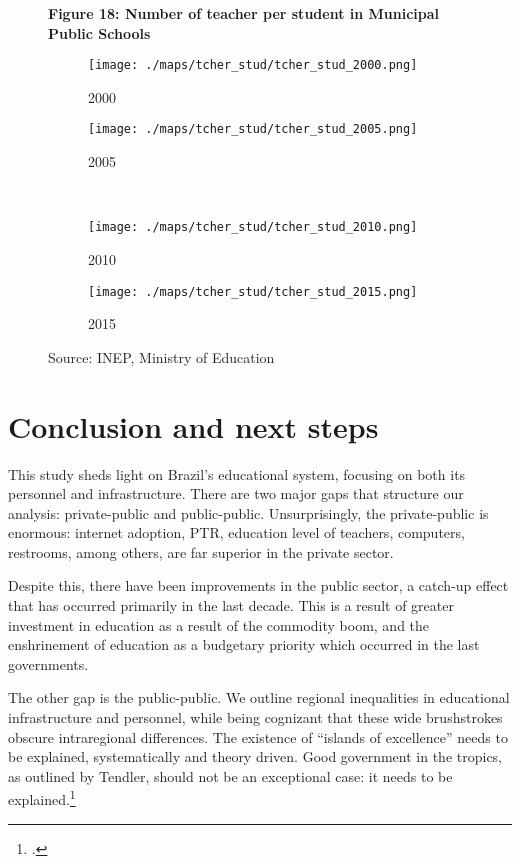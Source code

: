 \documentclass[12pt,]{book}
\let\rmarkdownfootnote\footnote%
\def\footnote{\protect\rmarkdownfootnote}
\begin{document}
\begin{figure}
    \centering
    \textbf{Figure 18: Number of teacher per student in Municipal Public Schools}
    \label{fig:map_tcher_stud}
     \begin{subfigure}{0.4\textwidth}
        \centering 
        \texttt{[image: ./maps/tcher\_stud/tcher\_stud\_2000.png]}
        \caption{2000}
    \end{subfigure} %
    \begin{subfigure}{0.4\textwidth}
        \centering
        \texttt{[image: ./maps/tcher\_stud/tcher\_stud\_2005.png]}
        \caption{2005}
    \end{subfigure} \\
    \begin{subfigure}{0.4\textwidth}
        \centering
        \texttt{[image: ./maps/tcher\_stud/tcher\_stud\_2010.png]}
        \caption{2010}
    \end{subfigure} %
    \begin{subfigure}{0.4\textwidth}
        \centering
        \texttt{[image: ./maps/tcher\_stud/tcher\_stud\_2015.png]}
        \caption{2015}
    \end{subfigure}
    \caption*{\footnotesize \hfill Source: INEP, Ministry of Education}
\end{figure}

\section{Conclusion and next steps}

This study sheds light on Brazil's educational system, focusing on both its personnel and infrastructure. There are two major gaps that structure our analysis: private-public and public-public. Unsurprisingly, the private-public is enormous: internet adoption, PTR, education level of teachers, computers, restrooms, among others, are far superior in the private sector.

Despite this, there have been improvements in the public sector, a catch-up effect that has occurred primarily in the last decade. This is a result of greater investment in education as a result of the commodity boom, and the enshrinement of education as a budgetary priority which occurred in the last governments.

The other gap is the public-public. We outline regional inequalities in educational infrastructure and personnel, while being cognizant that these wide brushstrokes obscure intraregional differences. The existence of ``islands of excellence'' needs to be explained, systematically and theory driven. Good government in the tropics, as outlined by Tendler, should not be an exceptional case: it needs to be explained.\footnote{\citet{tendler_good_1997}.}
\end{document}
